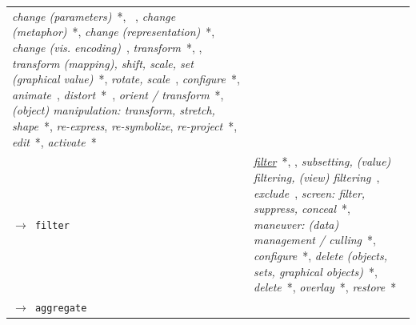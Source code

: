 \begin{table}
\begin{center}
\begin{tabular}{p{}>{\RaggedRight}p{}}
        	{\it change (parameters)}~\cite{Dix1998}*, ~\cite{Chi1998},
        	{\it change (metaphor)}~\cite{Gotz2008}*,
        	{\it change (representation)}~\cite{Dix1998}*,
        	{\it change (vis. encoding)}~\cite{Munzner2009a},
        	{\it transform}~\cite{Raskin2000}*, \cite{Marchionini2006,Wilkinson2005},
        	{\it transform (mapping), shift, scale, set (graphical value)}~\cite{Chuah1996}*,
        	{\it rotate, scale}~\cite{Chi1998},
        	{\it configure}~\cite{Valiati2006}*,
        	{\it animate}~\cite{Chi1998,Wilkinson2005},
        	{\it distort}~\cite{Keim2002,Ward2004}*~\cite{Chi1998},
        	{\it orient / transform}~\cite{Springmeyer1992}*,
        	{\it (object) manipulation: transform, stretch, shape}~\cite{Mullins1993}*,
        	{\it re-express},
        	{\it re-symbolize},
        	{\it re-project}~\cite{Roth2012,Roth2013}*,
        	{\it edit}~\cite{Mullins1993,Roth2012,Roth2013}*,
        	{\it activate}~\cite{Raskin2000}*
    
    \\
    
        {\tt $\rightarrow$ filter}\index{{\tt filter}} &
    
        	{\it \underline{filter}}~\cite{Amar2005,Card1999,Gotz2008,Heer2012,Keim2002,Klein2006,Lee2006,Mullins1993,Pike2009,Pirolli2005,Roth2012,Roth2013,Shneiderman1996,Yi2007}*, \cite{Munzner2009a,Tory2004,Wilkinson2005}, %
        	{\it subsetting, (value) filtering, (view) filtering}~\cite{Chi1998},
        	{\it exclude}~\cite{Marchionini2006,Tory2004},
        	{\it screen: filter, suppress, conceal}~\cite{Mullins1993}*, %
        	{\it maneuver: (data) management / culling}~\cite{Springmeyer1992}*,
        	{\it configure}~\cite{Valiati2006}*,
        	{\it delete (objects, sets, graphical objects)}~\cite{Chuah1996}*,
        	{\it delete}~\cite{Card1999,Gotz2008,Raskin2000}*,
        	{\it overlay}~\cite{Roth2012,Roth2013}*,
        	{\it restore}~\cite{Gotz2008,Mullins1993}*
    
    \\ \rowcolor{gray!10}
    
        {\tt $\rightarrow$ aggregate}\index{{\tt aggregate}} &
    

\end{tabular}
\end{center}
\end{table}

